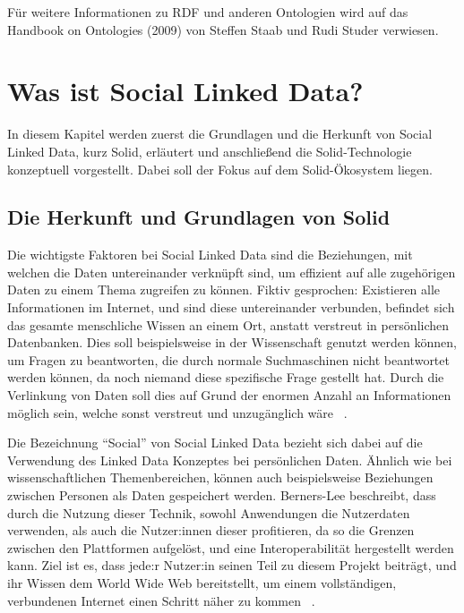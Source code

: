 \documentclass[acmtog]{acmart}
\begin{document}
Für weitere Informationen zu RDF und anderen Ontologien wird auf das Handbook on Ontologies (2009) von Steffen Staab und Rudi Studer verwiesen.~\cite{staab2009handbook}

\label{section:wasIstSocialLinkedData}
\section{Was ist Social Linked Data?}

In diesem Kapitel werden zuerst die Grundlagen und die Herkunft von Social Linked Data, kurz Solid, erläutert und anschließend die Solid-Technologie konzeptuell vorgestellt. Dabei soll der Fokus auf dem Solid-Ökosystem liegen.

\subsection{Die Herkunft und Grundlagen von Solid}

Die wichtigste Faktoren bei Social Linked Data sind die Beziehungen, mit welchen die Daten untereinander verknüpft sind, um effizient auf alle zugehörigen Daten zu einem Thema zugreifen zu können. Fiktiv gesprochen: Existieren alle Informationen im Internet, und sind diese untereinander verbunden, befindet sich das gesamte menschliche Wissen an einem Ort, anstatt verstreut in persönlichen Datenbanken. Dies soll beispielsweise in der Wissenschaft genutzt werden können, um Fragen zu beantworten, die durch normale Suchmaschinen nicht beantwortet werden können, da noch niemand diese spezifische Frage gestellt hat. Durch die Verlinkung von Daten soll dies auf Grund der enormen Anzahl an Informationen möglich sein, welche sonst verstreut und unzugänglich wäre ~\cite{TED.2010}.

Die Bezeichnung "`Social"' von Social Linked Data bezieht sich dabei auf die Verwendung des Linked Data Konzeptes bei persönlichen Daten. Ähnlich wie bei wissenschaftlichen Themenbereichen, können auch beispielsweise Beziehungen zwischen Personen als Daten gespeichert werden. Berners-Lee beschreibt, dass durch die Nutzung dieser Technik, sowohl Anwendungen die Nutzerdaten verwenden, als auch die Nutzer:innen dieser profitieren, da so die Grenzen zwischen den Plattformen aufgelöst, und eine Interoperabilität hergestellt werden kann. Ziel ist es, dass jede:r Nutzer:in seinen Teil zu diesem Projekt beiträgt, und ihr Wissen dem World Wide Web bereitstellt, um einem vollständigen, verbundenen Internet einen Schritt näher zu kommen  ~\cite{TED.2010}.
\end{document}
